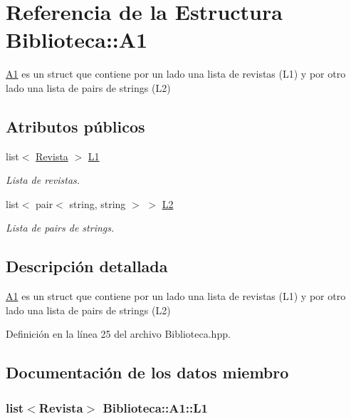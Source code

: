 \hypertarget{struct_biblioteca_1_1_a1}{\section{Referencia de la Estructura Biblioteca\-:\-:A1}
\label{struct_biblioteca_1_1_a1}
}


\hyperlink{struct_biblioteca_1_1_a1}{A1} es un struct que contiene por un lado una lista de revistas (L1) y por otro lado una lista de pairs de strings (L2)  


\subsection*{Atributos públicos}
\begin{DoxyCompactItemize}
\item 
list$<$ \hyperlink{class_revista}{Revista} $>$ \hyperlink{struct_biblioteca_1_1_a1_a5aa560f4da33b9157b1b69c974de59c2}{L1}
\begin{DoxyCompactList}\small\item\em Lista de revistas. \end{DoxyCompactList}\item 
list$<$ pair$<$ string, string $>$ $>$ \hyperlink{struct_biblioteca_1_1_a1_a8463b0647409ec910cfdbf7fdaaa86b2}{L2}
\begin{DoxyCompactList}\small\item\em Lista de pairs de strings. \end{DoxyCompactList}\end{DoxyCompactItemize}


\subsection{Descripción detallada}
\hyperlink{struct_biblioteca_1_1_a1}{A1} es un struct que contiene por un lado una lista de revistas (L1) y por otro lado una lista de pairs de strings (L2) 

Definición en la línea 25 del archivo Biblioteca.\-hpp.



\subsection{Documentación de los datos miembro}
\hypertarget{struct_biblioteca_1_1_a1_a5aa560f4da33b9157b1b69c974de59c2}{
\subsubsection[{L1}]{\setlength{\rightskip}{0pt plus 5cm}list$<${\bf Revista}$>$ Biblioteca\-::\-A1\-::\-L1}}\label{struct_biblioteca_1_1_a1_a5aa560f4da33b9157b1b69c974de59c2}


